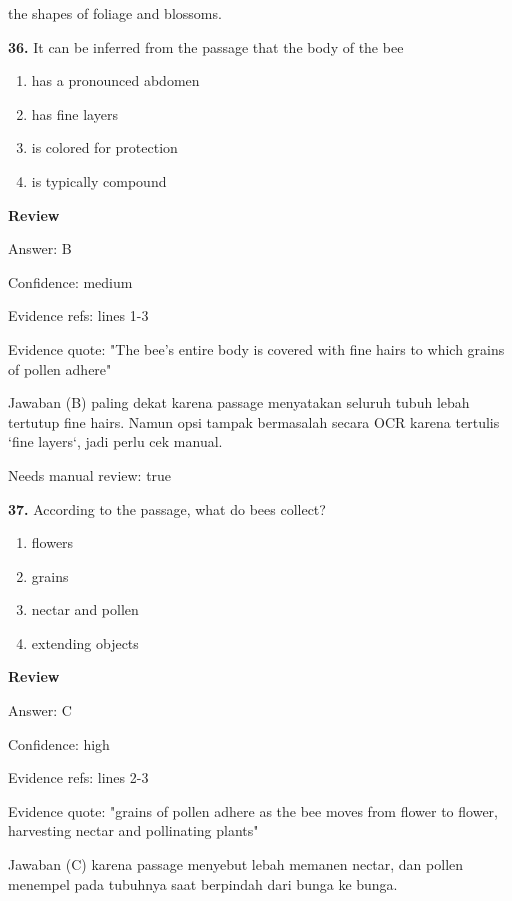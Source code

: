 \documentclass[12pt]{article}
\begin{document}
the shapes of foliage and blossoms.\par
\endgroup
\medskip
\noindent\textbf{36.} It can be inferred from the passage that the body of the bee
\begin{enumerate}[label=(\Alph*),leftmargin=*,itemsep=0.2em]
\item has a pronounced abdomen
\item has fine layers
\item is colored for protection
\item is typically compound
\end{enumerate}
\par
\begingroup
\setlength{\parskip}{0pt}
\setlength{\parindent}{0pt}
\textbf{Review}\par
Answer: B\par
Confidence: medium\par
Evidence refs: lines 1-3\par
Evidence quote: "The bee's entire body is covered with fine hairs to which grains of pollen adhere"\par
Jawaban (B) paling dekat karena passage menyatakan seluruh tubuh lebah tertutup fine hairs. Namun opsi tampak bermasalah secara OCR karena tertulis `fine layers`, jadi perlu cek manual.\par
Needs manual review: true\par
\endgroup
\par
\vspace{0.25\baselineskip}
\noindent\textbf{37.} According to the passage, what do bees collect?
\begin{enumerate}[label=(\Alph*),leftmargin=*,itemsep=0.2em]
\item flowers
\item grains
\item nectar and pollen
\item extending objects
\end{enumerate}
\par
\begingroup
\setlength{\parskip}{0pt}
\setlength{\parindent}{0pt}
\textbf{Review}\par
Answer: C\par
Confidence: high\par
Evidence refs: lines 2-3\par
Evidence quote: "grains of pollen adhere as the bee moves from flower to flower, harvesting nectar and pollinating plants"\par
Jawaban (C) karena passage menyebut lebah memanen nectar, dan pollen menempel pada tubuhnya saat berpindah dari bunga ke bunga.\par
\end{document}
